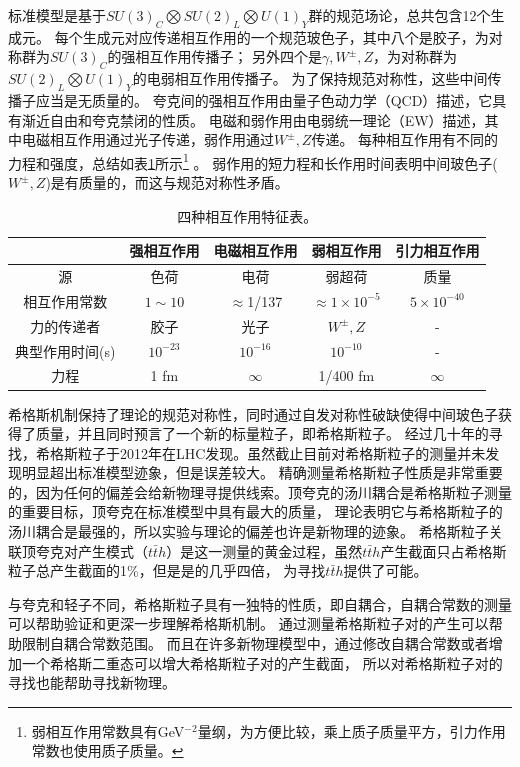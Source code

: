 标准模型是基于$SU(3)_C\bigotimes SU(2)_L\bigotimes U(1)_Y$群的规范场论，总共包含12个生成元。
每个生成元对应传递相互作用的一个规范玻色子，其中八个是胶子，为对称群为$SU(3)_C$的强相互作用传播子；
另外四个是$\gamma, W^{\pm}, Z$，为对称群为$SU(2)_L\bigotimes U(1)_Y$的电弱相互作用传播子。
为了保持规范对称性，这些中间传播子应当是无质量的。
夸克间的强相互作用由量子色动力学（QCD）描述，它具有渐近自由和夸克禁闭的性质。
电磁和弱作用由电弱统一理论（EW）描述，其中电磁相互作用通过光子传递，弱作用通过$W^{\pm}, Z$传递。
每种相互作用有不同的力程和强度，总结如表\ref{tab:summary_interactions}所示\footnote{弱相互作用常数具有GeV$^{-2}$量纲，为方便比较，乘上质子质量平方，引力作用常数也使用质子质量。} 。
弱作用的短力程和长作用时间表明中间玻色子($W^{\pm}, Z$)是有质量的，而这与规范对称性矛盾。
\begin{table}[h]
\centering
\begin{tabular}{c|c|c|c|c}
\hline
     		&强相互作用   &电磁相互作用  &弱相互作用 &引力相互作用 \\
\hline
源		&色荷  &电荷   &弱超荷   &质量 \\
相互作用常数 &$1\sim 10$  &$\approx$1/137   &$\approx 1\times 10^{-5}$    &$5\times 10^{-40}$ \\
力的传递者 &胶子  &光子  &$W^{\pm}, Z$  &- \\
典型作用时间(s) &$10^{-23}$  &$10^{-16}$  &$10^{-10}$   &- \\
力程  &1 fm  &$\infty$   &1/400 fm  &$\infty$  \\
\hline
\end{tabular}
\caption{四种相互作用特征表。}
\label{tab:summary_interactions}
\end{table}

希格斯机制保持了理论的规范对称性，同时通过自发对称性破缺使得中间玻色子获得了质量，并且同时预言了一个新的标量粒子，即希格斯粒子。
经过几十年的寻找，希格斯粒子于2012年在LHC发现。虽然截止目前对希格斯粒子的测量并未发现明显超出标准模型迹象，但是误差较大。
精确测量希格斯粒子性质是非常重要的，因为任何的偏差会给新物理寻提供线索。顶夸克的汤川耦合是希格斯粒子测量的重要目标，顶夸克在标准模型中具有最大的质量，
理论表明它与希格斯粒子的汤川耦合是最强的，所以实验与理论的偏差也许是新物理的迹象\cite{}。
希格斯粒子关联顶夸克对产生模式（$t\bar{t}h$）是这一测量的黄金过程，虽然$t\bar{t}h$产生截面只占希格斯粒子总产生截面的1\%，但是\RunTwo 是\RunOne 的几乎四倍，
为寻找$t\bar{t}h$提供了可能。

与夸克和轻子不同，希格斯粒子具有一独特的性质，即自耦合，自耦合常数的测量可以帮助验证和更深一步理解希格斯机制。
通过测量希格斯粒子对的产生可以帮助限制自耦合常数范围。
而且在许多新物理模型中，通过修改自耦合常数或者增加一个希格斯二重态可以增大希格斯粒子对的产生截面，
所以对希格斯粒子对的寻找也能帮助寻找新物理。

